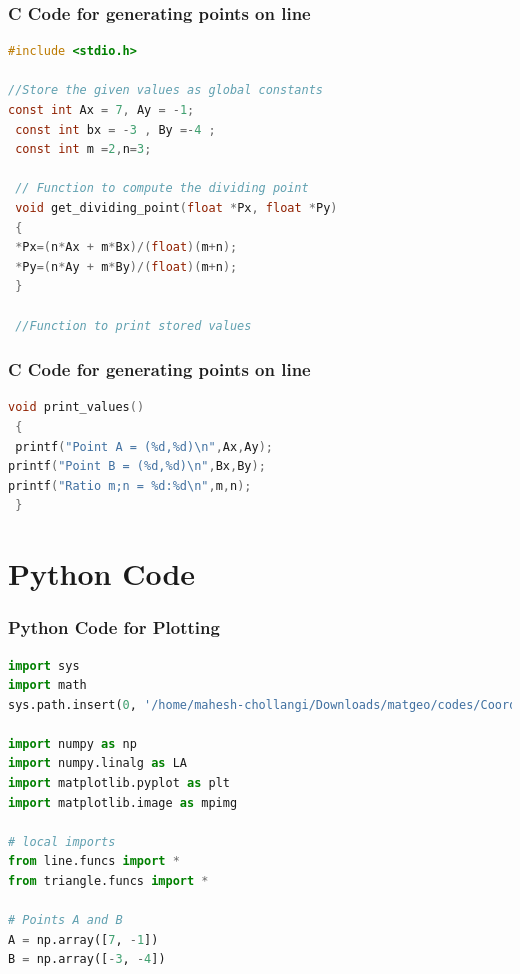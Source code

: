 \documentclass{beamer}
\theoremstyle{remark}
\numberwithin{equation}{section}
\begin{document}
\begin{frame}[fragile]
\frametitle{C Code for generating points on line}
\begin{lstlisting}[language=C]
   #include <stdio.h>

//Store the given values as global constants
const int Ax = 7, Ay = -1;
 const int bx = -3 , By =-4 ;
 const int m =2,n=3;

 // Function to compute the dividing point 
 void get_dividing_point(float *Px, float *Py)
 {
 *Px=(n*Ax + m*Bx)/(float)(m+n);
 *Py=(n*Ay + m*By)/(float)(m+n);
 }

 //Function to print stored values 

\end{lstlisting}
\end{frame}

\begin{frame}[fragile]
\frametitle{C Code for generating points on line}
\begin{lstlisting}[language=C]
        void print_values()
 {
 printf("Point A = (%d,%d)\n",Ax,Ay);
printf("Point B = (%d,%d)\n",Bx,By);
printf("Ratio m;n = %d:%d\n",m,n);
 }
\end{lstlisting}
\end{frame}

\section{Python Code}
\begin{frame}[fragile]
\frametitle{Python Code for Plotting}
\begin{lstlisting}[language=Python]
import sys
import math
sys.path.insert(0, '/home/mahesh-chollangi/Downloads/matgeo/codes/CoordGeo')

import numpy as np
import numpy.linalg as LA
import matplotlib.pyplot as plt
import matplotlib.image as mpimg

# local imports
from line.funcs import *
from triangle.funcs import *

# Points A and B
A = np.array([7, -1])
B = np.array([-3, -4])



\end{lstlisting}
\end{frame}
\end{document}
